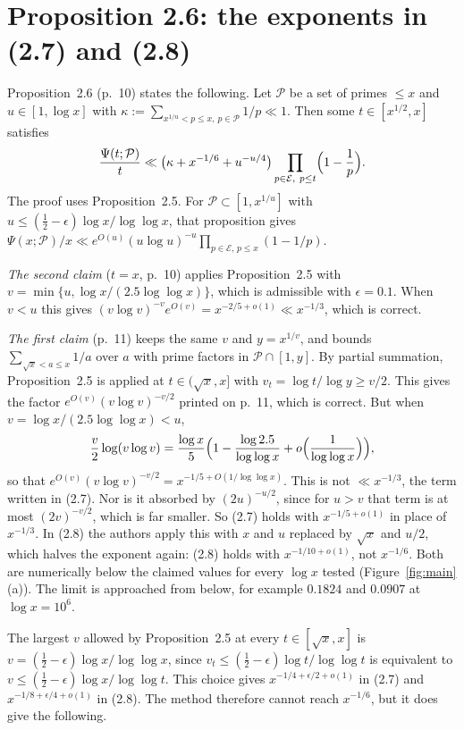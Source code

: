 \documentclass[11pt,a4paper]{amsart}
\theoremstyle{remark}
\newcommand{\cP}{\mathcal P}
\newcommand{\cE}{\mathcal E}
\begin{document}
\section{Proposition 2.6: the exponents in (2.7) and (2.8)}\label{sec:26}

Proposition~2.6 (p.~10) states the following. Let $\cP$ be a set of primes $\le x$ and $u\in[1,\log x]$
with $\kappa:=\sum_{x^{1/u}<p\le x,\ p\in\cP}1/p\ll1$. Then some $t\in[x^{1/2},x]$ satisfies
\[
\frac{\Psi(t;\cP)}t\ll\bigl(\kappa+x^{-1/6}+u^{-u/4}\bigr)\prod_{p\in\cE,\ p\le t}\Bigl(1-\frac1p\Bigr).
\]
The proof uses Proposition~2.5. For $\cP\subset[1,x^{1/u}]$ with
$u\le(\frac12-\epsilon)\log x/\log\log x$, that proposition gives
$\Psi(x;\cP)/x\ll e^{O(u)}(u\log u)^{-u}\prod_{p\in\cE,\,p\le x}(1-1/p)$.

\emph{The second claim} ($t=x$, p.~10) applies Proposition~2.5 with $v=\min\{u,\log x/(2.5\log\log x)\}$,
which is admissible with $\epsilon=0.1$. When $v<u$ this gives
$(v\log v)^{-v}e^{O(v)}=x^{-2/5+o(1)}\ll x^{-1/3}$, which is correct.

\emph{The first claim} (p.~11) keeps the same $v$ and $y=x^{1/v}$, and bounds
$\sum_{\sqrt x<a\le x}1/a$ over $a$ with prime factors in $\cP\cap[1,y]$. By partial summation,
Proposition~2.5 is applied at $t\in(\sqrt x,x]$ with $v_t=\log t/\log y\ge v/2$. This gives the factor
$e^{O(v)}(v\log v)^{-v/2}$ printed on p.~11, which is correct. But when $v=\log x/(2.5\log\log x)<u$,
\begin{equation}\label{eq:v2}
\frac{v}2\log(v\log v)=\frac{\log x}5\Bigl(1-\frac{\log 2.5}{\log\log x}+o\Bigl(\frac1{\log\log x}\Bigr)\Bigr),
\end{equation}
so that $e^{O(v)}(v\log v)^{-v/2}=x^{-1/5+O(1/\log\log x)}$.
This is not $\ll x^{-1/3}$, the term written in (2.7). Nor is it absorbed by $(2u)^{-u/2}$, since for
$u>v$ that term is at most $(2v)^{-v/2}$, which is far smaller. So (2.7) holds with $x^{-1/5+o(1)}$ in
place of $x^{-1/3}$. In (2.8) the authors apply this with $x$ and $u$ replaced by $\sqrt x$ and $u/2$, which
halves the exponent again: (2.8) holds with $x^{-1/10+o(1)}$, not $x^{-1/6}$. Both are numerically below
the claimed values for every $\log x$ tested (Figure~\ref{fig:main}(a)). The limit is approached from
below, for example $0.1824$ and $0.0907$ at $\log x=10^6$.

The largest $v$ allowed by Proposition~2.5 at every $t\in[\sqrt x,x]$ is
$v=(\frac12-\epsilon)\log x/\log\log x$, since $v_t\le(\frac12-\epsilon)\log t/\log\log t$ is equivalent
to $v\le(\frac12-\epsilon)\log x/\log\log t$. This choice gives $x^{-1/4+\epsilon/2+o(1)}$ in (2.7) and
$x^{-1/8+\epsilon/4+o(1)}$ in (2.8). The method therefore cannot reach $x^{-1/6}$, but it does give the
following.
\end{document}
